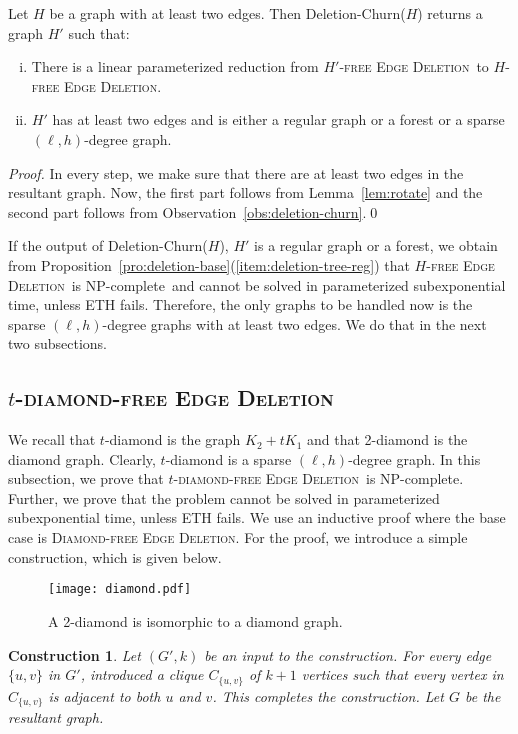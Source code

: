 \documentclass[envcountsame,envcountsect,10pt,oribibl]{llncs}
\newcommand{\pname}[1]{\textnormal{\textsc{#1}}}
\newcommand{\cclass}[1]{\textnormal{\textsf{#1}}}
\newcommand{\HED}{\pname{$H$-free Edge Deletion}}
\newcommand{\HDED}{\pname{$H'$-free Edge Deletion}}
\newcommand{\TDDED}{\pname{$t$-diamond-free Edge Deletion}}
\newcommand{\DED}{\pname{Diamond-free Edge Deletion}}
\newcommand{\NPC}{\cclass{NP-complete}}
\newtheorem{construction}{Construction}
\begin{document}
\begin{lemma}
  \label{lem:deletion-churn}
  Let $H$ be a graph with at least two edges. Then Deletion-Churn($H$)
  returns a graph $H'$ such that:
  \begin{enumerate}[(i)]
  \item\label{item:deletion-churn-red} There is a linear parameterized reduction from \HDED\ to \HED.
  \item\label{item:deletion-churn-output} $H'$ has at least two edges and is either a regular graph
    or a forest or a sparse $(\ell, h)$-degree graph.
  \end{enumerate}
\end{lemma}
\begin{proof}
  In every step, we make sure that there are at least two edges in the resultant graph.
  Now, the first part follows from Lemma~\ref{lem:rotate} and the second part follows
  from Observation~\ref{obs:deletion-churn}.\qed
\end{proof}

If the output of Deletion-Churn($H$), $H'$ is a regular graph or a forest,
we obtain from Proposition~\ref{pro:deletion-base}(\ref{item:deletion-tree-reg}) that
\HED\ is \NPC\ and cannot be solved in parameterized subexponential
time, unless ETH fails.
Therefore, the only graphs to be handled now is the sparse $(\ell,h)$-degree graphs with 
at least two edges. We do that in the next two subsections.
\subsection{\TDDED}
\label{sec:tdiamond}

We recall that $t$-diamond is the graph $K_2+tK_1$ and that 
2-diamond is the diamond graph. Clearly, $t$-diamond is a sparse $(\ell, h)$-degree graph.
In this subsection, we prove that \TDDED\ is \NPC. Further, we 
prove that the problem cannot be solved in parameterized subexponential time,
unless ETH fails. We use an inductive proof where the base case is \DED.
For the proof, we introduce a simple construction, which is 
given below.


\begin{figure}[h]
  \centering
  \texttt{[image: diamond.pdf]}
  \caption{A 2-diamond is isomorphic to a diamond graph.}
  \label{fig:diamond}
\end{figure}


\begin{construction}
  \label{con:diamond}
  Let $(G',k)$ be an input to the construction.
  For every edge $\{u,v\}$ in $G'$, introduced a clique $C_{\{u,v\}}$ of $k+1$
  vertices such that every vertex in $C_{\{u,v\}}$ is adjacent to both $u$ and $v$.
  This completes the construction. Let $G$ be the resultant graph.
\end{construction}
\end{document}
